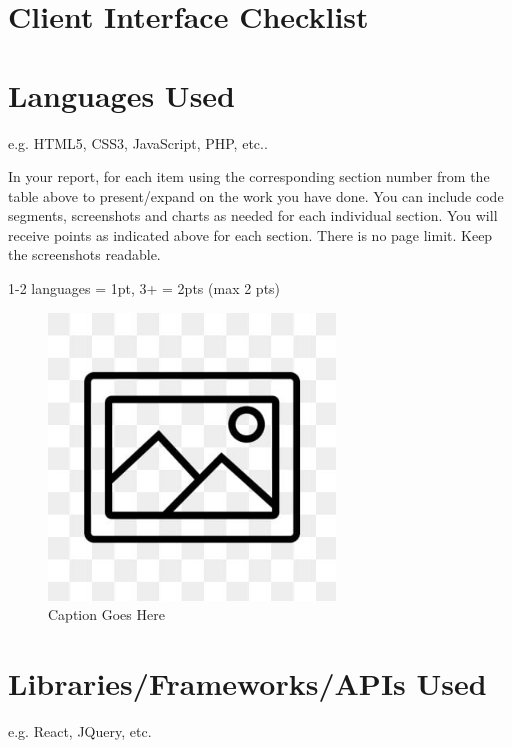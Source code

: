 \documentclass[12pt, letterpaper]{article}
\begin{document}
\newpage

\tableofcontents

\newpage

\section*{Client Interface Checklist}

\section{Languages Used}
e.g. HTML5, CSS3, JavaScript, PHP, etc..

In your report, for each item using the corresponding section number from the table above to present/expand on the work you have done. You can include code segments, screenshots and charts as needed for each individual section. You will receive points as indicated above for each section. There is no page limit. Keep the screenshots readable.

1-2 languages = 1pt, 3+ = 2pts (max 2 pts)

\begin{figure}[htbp]
	\centering
	\includegraphics[width=3in]{images/placeholder.jpg}
	\caption{Caption Goes Here}
 \end{figure}

 \newpage

\section{Libraries/Frameworks/APIs Used}
e.g. React, JQuery, etc.
\end{document}
